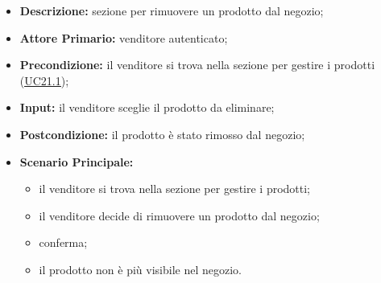         \begin{itemize}
            \item \textbf{Descrizione:} sezione per rimuovere un prodotto dal negozio;
            \item \textbf{Attore Primario:} venditore autenticato;
            \item \textbf{Precondizione:} il venditore si trova nella sezione per gestire i prodotti (\hyperref[sec:UC21.1]{\underline{UC21.1}});
            \item \textbf{Input:} il venditore sceglie il prodotto da eliminare;
            \item \textbf{Postcondizione:} il prodotto è stato rimosso dal negozio;
            \item \textbf{Scenario Principale:} 
                \begin{itemize}
                    \item il venditore si trova nella sezione per gestire i prodotti;
                    \item il venditore decide di rimuovere un prodotto dal negozio;
                    \item conferma;
                    \item il prodotto non è più visibile nel negozio.
                \end{itemize}
        \end{itemize}


